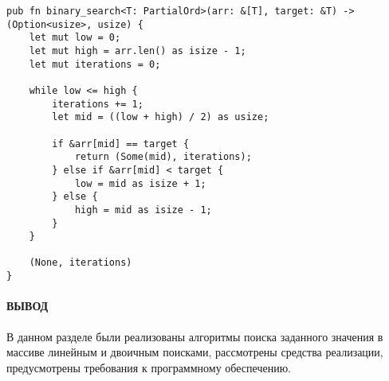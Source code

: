 \begin{center}
\captionsetup{justification=raggedright,singlelinecheck=off}
\begin{lstlisting}[label=lst:bin_search,caption=Алгоритм нахождения объектов бинарным поиском]
pub fn binary_search<T: PartialOrd>(arr: &[T], target: &T) -> (Option<usize>, usize) {
    let mut low = 0;
    let mut high = arr.len() as isize - 1;
    let mut iterations = 0;

    while low <= high {
        iterations += 1;
        let mid = ((low + high) / 2) as usize;

        if &arr[mid] == target {
            return (Some(mid), iterations);
        } else if &arr[mid] < target {
            low = mid as isize + 1;
        } else {
            high = mid as isize - 1;
        }
    }

    (None, iterations)
}
\end{lstlisting}
\end{center}

\paragraph*{ВЫВОД} ${}$ \\

В данном разделе были реализованы алгоритмы поиска заданного значения в массиве линейным и двоичным поисками, рассмотрены средства реализации, 
предусмотрены требования к программному обеспечению.

\clearpage